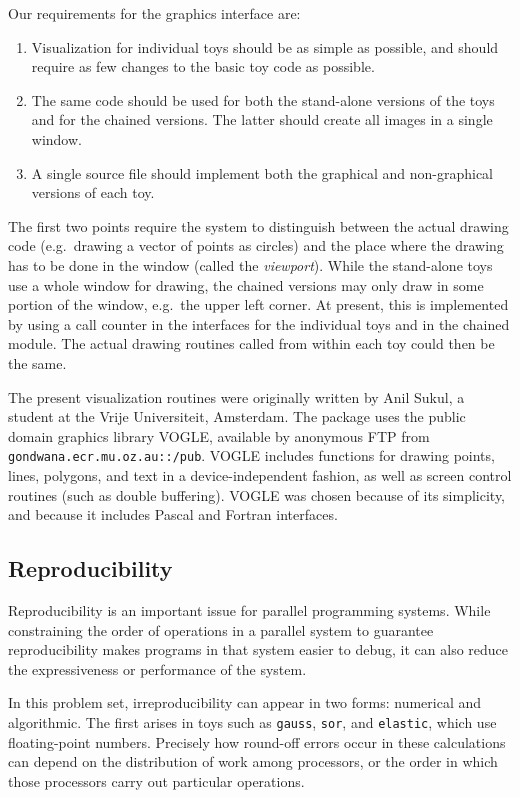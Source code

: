 Our requirements for the graphics interface are:
\begin{enumerate}
\item	Visualization for individual toys should be as simple as possible,
	and should require as few changes to the basic toy code as possible.
\item	The same code should be used for both the stand-alone versions of the toys and for the chained versions.
	The latter should create all images in a single window.
\item	A single source file should implement both the graphical and non-graphical versions of each toy.
\end{enumerate}
The first two points require the system to distinguish between the actual drawing code
(e.g.\ drawing a vector of points as circles)
and the place where the drawing has to be done in the window (called the {\em{viewport}\/}).
While the stand-alone toys use a whole window for drawing,
the chained versions may only draw in some portion of the window, e.g.\ the upper left corner.
At present,
this is implemented by using a call counter
in the interfaces for the individual toys and in the chained module.
The actual drawing routines called from within each toy could then be the same.

The present visualization routines were originally written by Anil Sukul,
a student at the Vrije Universiteit, Amsterdam.
The package uses the public domain graphics library VOGLE,
available by anonymous FTP from {\tt{gondwana.ecr.mu.oz.au::/pub}}.
VOGLE includes functions for drawing points, lines, polygons, and text in a device-independent fashion, 
as well as screen control routines (such as double buffering).
VOGLE was chosen because of its simplicity,
and because it includes Pascal and Fortran interfaces.

\subsection{Reproducibility\label{s:issues-reproduce}}

Reproducibility is an important issue for parallel programming systems.
While constraining the order of operations in a parallel system to guarantee reproducibility makes programs in that system easier to debug,
it can also reduce the expressiveness or performance of the system.

In this problem set, irreproducibility can appear in two forms: numerical and algorithmic.
The first arises in toys such as {\tt{gauss}}, {\tt{sor}}, and {\tt{elastic}}, which use floating-point numbers.
Precisely how round-off errors occur in these calculations can depend on the distribution of work among processors,
or the order in which those processors carry out particular operations.

